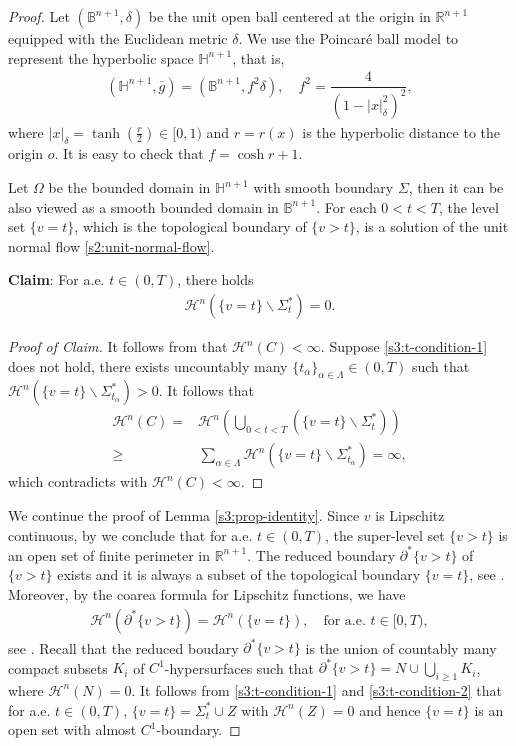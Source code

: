 \documentclass[11pt,reqno]{amsart}
\theoremstyle{definition}
\theoremstyle{remark}
\numberwithin{equation}{section}
\renewcommand{\(}{\left(}
\renewcommand{\)}{\right)}
\renewcommand{\~}{\widetilde}
\renewcommand{\-}{\overline}
\renewcommand{\a}{\alpha}
\renewcommand{\d}{\delta}
\begin{document}
\begin{proof}
	Let $(\mathbb B^{n+1},\d)$ be the unit open ball centered at the origin in $\mathbb R^{n+1}$ equipped with the Euclidean metric $\d$. We use the Poincar\'e ball model to represent the hyperbolic space $\mathbb H^{n+1}$, that is,
	\begin{align*}
	(\mathbb H^{n+1},\-g)=\(\mathbb B^{n+1},f^2\d\), \quad f^2=\dfrac{4}{(1-|x|_\d^2)^2},
	\end{align*}
	where $|x|_\d=\tanh\(\frac{r}{2}\)\in [0,1)$ and $r=r(x)$ is the hyperbolic distance to the origin $o$. It is easy to check that $f=\cosh r+1$.

Let $\Omega$ be the bounded domain in $\mathbb H^{n+1}$ with smooth boundary $\Sigma$, then it can be also viewed as a smooth bounded domain in $\mathbb B^{n+1}$. For each $0<t<T$, the level set $\{v=t\}$, which is the topological boundary of $\{v>t\}$, is a solution of the unit normal flow \eqref{s2:unit-normal-flow}.
	
	{\bf Claim}: For a.e. $t\in (0,T)$, there holds
	\begin{align}\label{s3:t-condition-1}
	\mathcal{H}^n(\{v=t\}\backslash \Sigma_t^\ast)=0.
	\end{align}
	\begin{proof}[Proof of Claim] It follows from \cite[Corollary 1.6]{Li-Nirenberg2005} that $\mathcal{H}^n(C)<\infty$. Suppose \eqref{s3:t-condition-1} does not hold, there exists uncountably many $\{t_\alpha\}_{\a\in \Lambda}\in (0,T)$ such that
	$\mathcal{H}^n(\{v=t\}\backslash \Sigma_{t_\alpha}^\ast)>0$. It follows that
	\begin{align*}
	\mathcal{H}^n(C)=&\mathcal{H}^n\(\bigcup_{0<t<T}(\{v=t\}\backslash\Sigma_t^\ast)\)\\
\geq &\sum_{\a\in \Lambda}\mathcal{H}^n(\{v=t\}\backslash \Sigma_{t_\alpha}^\ast)=\infty,
	\end{align*}
	which contradicts with $\mathcal{H}^n(C)<\infty$.
\end{proof}
	
	We continue the proof of Lemma \ref{s3:prop-identity}. Since $v$ is Lipschitz continuous, by \cite[Theorem 13.1 and Example 13.3]{Maggi2012} we conclude that for a.e. $t\in (0,T)$, the super-level set $\{v>t\}$ is an open set of finite perimeter in $\mathbb R^{n+1}$. The reduced boundary $\partial^\ast \{v>t\}$ of $\{v>t\}$ exists and it is always a subset of the topological boundary $\{v=t\}$, see \cite[Remark 15.3]{Maggi2012}. Moreover, by the coarea formula for Lipschitz functions, we have
	\begin{align}\label{s3:t-condition-2}
	\mathcal{H}^n(\partial^\ast \{v>t\})=\mathcal{H}^n(\{v=t\}), \quad \text{for a.e. $t\in [0,T)$},
	\end{align}
	see \cite[Theorem 18.1 and Remark 18.2]{Maggi2012}. Recall that the reduced boudary $\partial^\ast \{v>t\}$ is the union of countably many compact subsets $K_i$ of $C^1$-hypersurfaces such that $\partial^\ast \{v>t\}=N \cup \bigcup_{i\geq 1}K_i$, where $\mathcal{H}^n(N)=0$. It follows from \eqref{s3:t-condition-1} and \eqref{s3:t-condition-2} that for a.e. $t\in (0,T)$,
	$\{v=t\}=\Sigma_t^\ast \cup Z$ with $\mathcal{H}^n(Z)=0$ and hence $\{v=t\}$ is an open set with almost $C^1$-boundary.
	

\end{proof}
\end{document}

